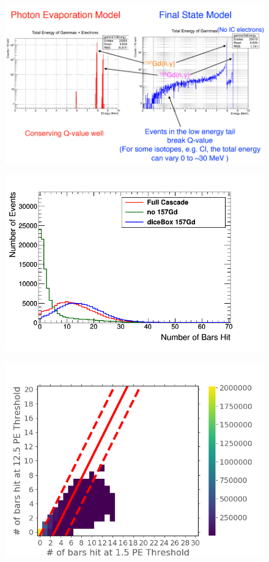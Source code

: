 \begin{figure}[H]
 \centering
 \includegraphics[width=0.7\linewidth]{Chapter4/Figs/Raster/gadolinium/pe_vs_fs_models_summed.png}
 \label{fig:pe_vs_fs_models_summed}
\end{figure}

\begin{figure}[H]
 \centering
 \includegraphics[width=0.7\linewidth]{Chapter4/Figs/Raster/gadolinium/numberOfBarsHitCascadeFinalStateDicebox.png}
 \label{fig:numberOfBarsHitCascadeFinalStateDicebox}
\end{figure}

\begin{figure}[H]
 \centering
 \includegraphics[width=0.7\linewidth]{Chapter4/Figs/Raster/gadolinium/noiseEventsSVM.png}
 \label{fig:noiseEventsSVM}
\end{figure}

